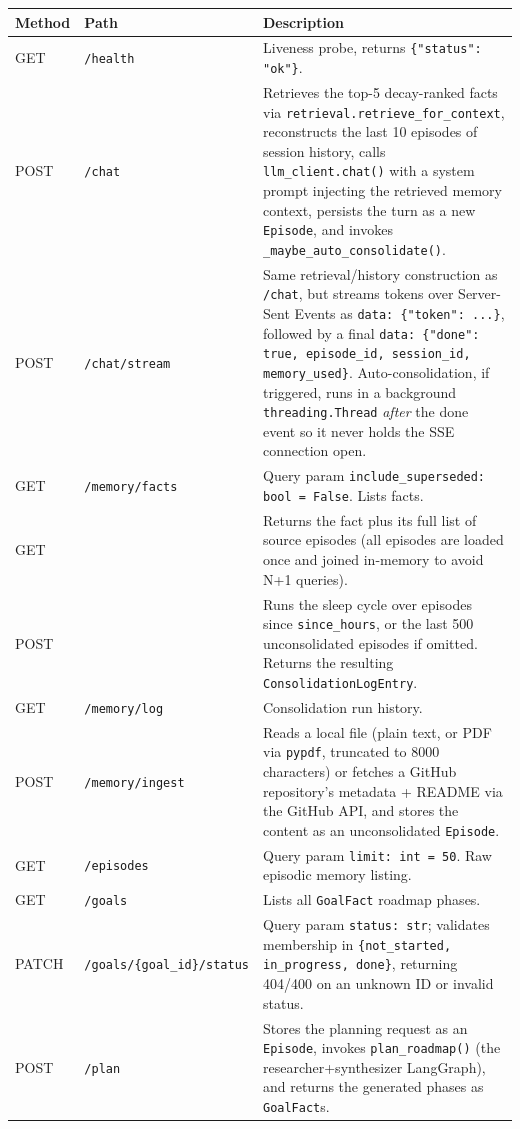 \documentclass[11pt,a4paper]{report}
\newcommand{\code}[1]{\texttt{\small #1}}
\newcommand{\bcode}[1]{\texttt{\small\seqsplit{#1}}}
\begin{document}
\begin{longtable}{L{1.5cm}L{3.2cm}L{8.4cm}}
\toprule
\textbf{Method} & \textbf{Path} & \textbf{Description} \\
\midrule
\endhead
GET & \code{/health} & Liveness probe, returns \code{\{"status": "ok"\}}. \\
POST & \code{/chat} & Retrieves the top-5 decay-ranked facts via \code{retrieval.retrieve\_for\_context}, reconstructs the last 10 episodes of session history, calls \code{llm\_client.chat()} with a system prompt injecting the retrieved memory context, persists the turn as a new \code{Episode}, and invokes \code{\_maybe\_auto\_consolidate()}. \\
POST & \code{/chat/stream} & Same retrieval/history construction as \code{/chat}, but streams tokens over Server-Sent Events as \code{data: \{"token": ...\}}, followed by a final \code{data: \{"done": true, episode\_id, session\_id, memory\_used\}}. Auto-consolidation, if triggered, runs in a background \code{threading.Thread} \emph{after} the done event so it never holds the SSE connection open. \\
GET & \code{/memory/facts} & Query param \code{include\_superseded: bool = False}. Lists facts. \\
GET & \bcode{/memory/fact/\{fact\_id\}} & Returns the fact plus its full list of source episodes (all episodes are loaded once and joined in-memory to avoid N+1 queries). \\
POST & \bcode{/memory/consolidate} & Runs the sleep cycle over episodes since \code{since\_hours}, or the last 500 unconsolidated episodes if omitted. Returns the resulting \code{ConsolidationLogEntry}. \\
GET & \code{/memory/log} & Consolidation run history. \\
POST & \code{/memory/ingest} & Reads a local file (plain text, or PDF via \code{pypdf}, truncated to 8000 characters) or fetches a GitHub repository's metadata + README via the GitHub API, and stores the content as an unconsolidated \code{Episode}. \\
GET & \code{/episodes} & Query param \code{limit: int = 50}. Raw episodic memory listing. \\
GET & \code{/goals} & Lists all \code{GoalFact} roadmap phases. \\
PATCH & \code{/goals/\{goal\_id\}/status} & Query param \code{status: str}; validates membership in \code{\{not\_started, in\_progress, done\}}, returning 404/400 on an unknown ID or invalid status. \\
POST & \code{/plan} & Stores the planning request as an \code{Episode}, invokes \code{plan\_roadmap()} (the researcher+synthesizer LangGraph), and returns the generated phases as \code{GoalFact}s. \\
\bottomrule
\end{longtable}
\end{document}
